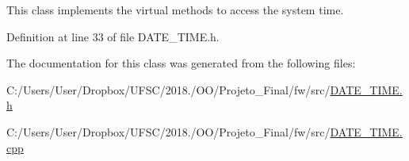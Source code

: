 This class implements the virtual methods to access the system time. 

Definition at line 33 of file D\+A\+T\+E\+\_\+\+T\+I\+M\+E.\+h.



The documentation for this class was generated from the following files\+:\begin{DoxyCompactItemize}
\item 
C\+:/\+Users/\+User/\+Dropbox/\+U\+F\+S\+C/2018./\+O\+O/\+Projeto\+\_\+\+Final/fw/src/\mbox{\hyperlink{_d_a_t_e___t_i_m_e_8h}{D\+A\+T\+E\+\_\+\+T\+I\+M\+E.\+h}}\item 
C\+:/\+Users/\+User/\+Dropbox/\+U\+F\+S\+C/2018./\+O\+O/\+Projeto\+\_\+\+Final/fw/src/\mbox{\hyperlink{_d_a_t_e___t_i_m_e_8cpp}{D\+A\+T\+E\+\_\+\+T\+I\+M\+E.\+cpp}}\end{DoxyCompactItemize}
